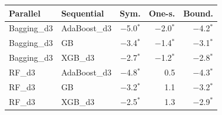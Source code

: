 \begin{tabular}{@{}llrrr@{}}
\toprule
Parallel & Sequential & Sym. & One-s. & Bound. \\
\midrule
Bagging\_d3 & AdaBoost\_d3 & $-$5.0$^{*}$ & $-$2.0$^{*}$ & $-$4.2$^{*}$ \\
Bagging\_d3 & GB & $-$3.4$^{*}$ & $-$1.4$^{*}$ & $-$3.1$^{*}$ \\
Bagging\_d3 & XGB\_d3 & $-$2.7$^{*}$ & $-$1.2$^{*}$ & $-$2.8$^{*}$ \\
RF\_d3 & AdaBoost\_d3 & $-$4.8$^{*}$ & 0.5 & $-$4.3$^{*}$ \\
RF\_d3 & GB & $-$3.2$^{*}$ & 1.1 & $-$3.2$^{*}$ \\
RF\_d3 & XGB\_d3 & $-$2.5$^{*}$ & 1.3 & $-$2.9$^{*}$ \\
\bottomrule
\end{tabular}